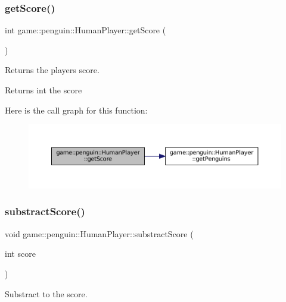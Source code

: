 \subsubsection{\texorpdfstring{get\+Score()}{getScore()}}
{\footnotesize\ttfamily int game\+::penguin\+::\+Human\+Player\+::get\+Score (\begin{DoxyParamCaption}{ }\end{DoxyParamCaption})\hspace{0.3cm}{\ttfamily [inline]}}



Returns the player\textquotesingle{}s score. 

\begin{DoxyReturn}{Returns}
int the score 
\end{DoxyReturn}
Here is the call graph for this function\+:
\nopagebreak
\begin{figure}[H]
\begin{center}
\leavevmode
\includegraphics[width=350pt]{classgame_1_1penguin_1_1_human_player_afe805f2359ba2c909c078a7fc3833ede_cgraph}
\end{center}
\end{figure}
\mbox{\label{classgame_1_1penguin_1_1_human_player_ac164fc99bfe3fc2c6818aeb7d41fc885}} 
\subsubsection{\texorpdfstring{substract\+Score()}{substractScore()}}
{\footnotesize\ttfamily void game\+::penguin\+::\+Human\+Player\+::substract\+Score (\begin{DoxyParamCaption}\item[{int}]{score }\end{DoxyParamCaption})}



Substract to the score. 


